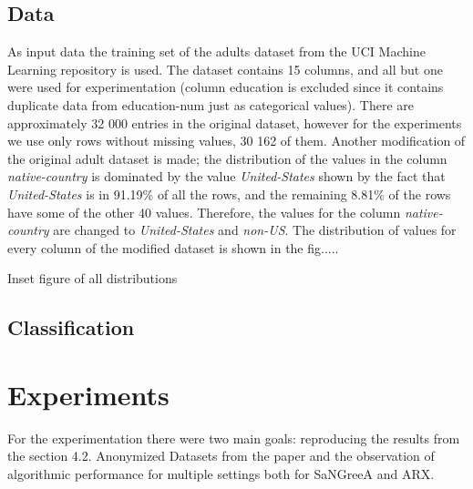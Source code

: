\documentclass{article}
\begin{document}
\subsection{Data}
As input data the training set of the adults dataset from the UCI Machine Learning repository is used. The dataset contains 15 columns, and all but one were used for experimentation (column education is excluded since it contains duplicate data from education-num just as categorical values). There are approximately 32 000 entries in the original dataset, however for the experiments we use only rows without missing values, 30 162 of them. Another modification of the original adult dataset is made; the distribution of the values in the column \textit{native-country} is dominated by the value \textit{United-States} shown by the fact that \textit{United-States} is in 91.19\% of all the rows, and the remaining 8.81\% of the rows have some of the other 40 values. Therefore, the values for the column \textit{native-country} are changed to \textit{United-States} and \textit{non-US}. The distribution of values for every column of the modified dataset is shown in the fig.....

Inset figure of all distributions

\subsection{Classification}
\newpage

\section{Experiments}
For the experimentation there were two main goals: reproducing the results from the section 4.2. Anonymized Datasets from the paper \cite{malle2017not} and the observation of algorithmic performance for multiple settings both for SaNGreeA and ARX. 
\end{document}
